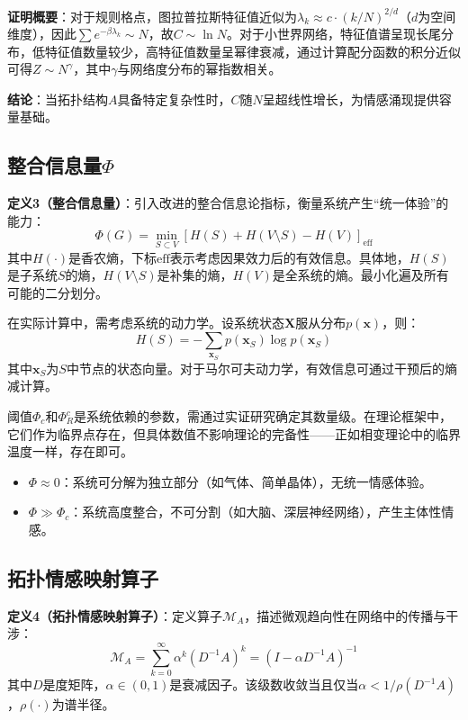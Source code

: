 \documentclass[12pt,a4paper]{article}
\theoremstyle{plain}
\begin{document}
\textbf{证明概要}：对于规则格点，图拉普拉斯特征值近似为$\lambda_k \approx c \cdot (k/N)^{2/d}$（$d$为空间维度），因此$\sum e^{-\beta \lambda_k} \sim N$，故$C \sim \ln N$。对于小世界网络，特征值谱呈现长尾分布，低特征值数量较少，高特征值数量呈幂律衰减，通过计算配分函数的积分近似可得$Z \sim N^\gamma$，其中$\gamma$与网络度分布的幂指数相关。

\textbf{结论}：当拓扑结构$A$具备特定复杂性时，$C$随$N$呈超线性增长，为情感涌现提供容量基础。

\subsection{整合信息量$\Phi$}

\textbf{定义3（整合信息量）}：引入改进的整合信息论指标，衡量系统产生“统一体验”的能力：
\begin{equation}
\Phi(G) = \min_{S \subset V} \left[ H(S) + H(V \setminus S) - H(V) \right]_{\text{eff}}
\end{equation}
其中$H(\cdot)$是香农熵，下标$\text{eff}$表示考虑因果效力后的有效信息。具体地，$H(S)$是子系统$S$的熵，$H(V \setminus S)$是补集的熵，$H(V)$是全系统的熵。最小化遍及所有可能的二分划分。

在实际计算中，需考虑系统的动力学。设系统状态$\mathbf{X}$服从分布$p(\mathbf{x})$，则：
\begin{equation}
H(S) = -\sum_{\mathbf{x}_S} p(\mathbf{x}_S) \log p(\mathbf{x}_S)
\end{equation}
其中$\mathbf{x}_S$为$S$中节点的状态向量。对于马尔可夫动力学，有效信息可通过干预后的熵减计算。

阈值$\Phi_c$和$\Phi_R^c$是系统依赖的参数，需通过实证研究确定其数量级。在理论框架中，它们作为临界点存在，但具体数值不影响理论的完备性——正如相变理论中的临界温度一样，存在即可。

\begin{itemize}
    \item $\Phi \approx 0$：系统可分解为独立部分（如气体、简单晶体），无统一情感体验。
    \item $\Phi \gg \Phi_c$：系统高度整合，不可分割（如大脑、深层神经网络），产生主体性情感。
\end{itemize}

\subsection{拓扑情感映射算子}

\textbf{定义4（拓扑情感映射算子）}：定义算子$\mathcal{M}_A$，描述微观趋向性在网络中的传播与干涉：
\begin{equation}
\mathcal{M}_A = \sum_{k=0}^{\infty} \alpha^k (D^{-1}A)^k = (I - \alpha D^{-1}A)^{-1}
\end{equation}
其中$D$是度矩阵，$\alpha \in (0,1)$是衰减因子。该级数收敛当且仅当$\alpha < 1/\rho(D^{-1}A)$，$\rho(\cdot)$为谱半径。
\end{document}
